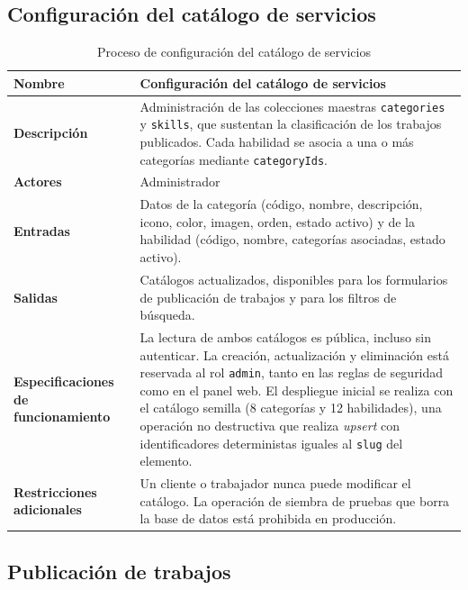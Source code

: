 \documentclass[doc,12pt,a4paper]{apa7}
\begin{document}
\subsection{Configuración del catálogo de servicios}

\begin{longtable}{|P{3.3cm}|L{11.2cm}|}
\caption{Proceso de configuración del catálogo de servicios}\\
\hline
\textbf{Nombre} & Configuración del catálogo de servicios \\ \hline
\textbf{Descripción} & Administración de las colecciones maestras \texttt{categories} y \texttt{skills}, que sustentan la clasificación de los trabajos publicados. Cada habilidad se asocia a una o más categorías mediante \texttt{categoryIds}. \\ \hline
\textbf{Actores} & Administrador \\ \hline
\textbf{Entradas} & Datos de la categoría (código, nombre, descripción, icono, color, imagen, orden, estado activo) y de la habilidad (código, nombre, categorías asociadas, estado activo). \\ \hline
\textbf{Salidas} & Catálogos actualizados, disponibles para los formularios de publicación de trabajos y para los filtros de búsqueda. \\ \hline
\textbf{Especificaciones de funcionamiento} & La lectura de ambos catálogos es pública, incluso sin autenticar. La creación, actualización y eliminación está reservada al rol \texttt{admin}, tanto en las reglas de seguridad como en el panel web. El despliegue inicial se realiza con el catálogo semilla (8 categorías y 12 habilidades), una operación no destructiva que realiza \textit{upsert} con identificadores deterministas iguales al \texttt{slug} del elemento. \\ \hline
\textbf{Restricciones adicionales} & Un cliente o trabajador nunca puede modificar el catálogo. La operación de siembra de pruebas que borra la base de datos está prohibida en producción. \\ \hline
\end{longtable}

\subsection{Publicación de trabajos}
\end{document}
